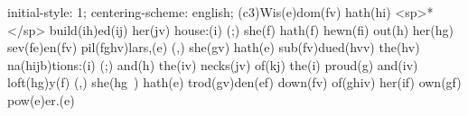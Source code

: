 initial-style: 1;
centering-scheme: english;
(c3)Wis(e)dom(fv) hath(hi) <sp>*</sp> build(ih)ed(ij) her(jv) house:(i) (;) she(f) hath(f) hewn(fi) out(h) her(hg) sev(fe)en(fv) pil(fghv)lars,(e) (,) she(gv) hath(e) sub(fv)dued(hvv) the(hv) na(hijb)tions:(i) (;) and(h) the(iv) necks(jv) of(kj) the(i) proud(g) and(iv) loft(hg)y(f) (,) she(hg~) hath(e) trod(gv)den(ef) down(fv) of(ghiv) her(if) own(gf) pow(e)er.(e)
